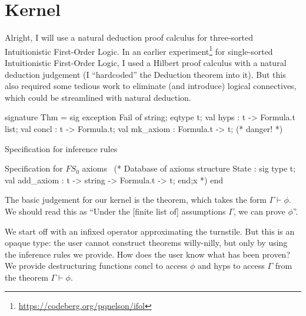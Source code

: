 
\section{Kernel}

\begin{node}
Alright, I will use a natural deduction proof calculus for
three-sorted Intuitionistic First-Order Logic. In an earlier
experiment\footnote{\url{https://codeberg.org/pqnelson/ifol}} for single-sorted Intuitionistic First-Order Logic, I used
a Hilbert proof calculus with a natural deduction judgement (I
``hardcoded'' the Deduction theorem into it). But this also required
some tedious work to eliminate (and introduce) logical connectives,
which could be streamlined with natural deduction.
\end{node}

\nwenddocs{}\endmoddef\nwstartdeflinemarkup\nwenddeflinemarkup
signature Thm = sig
  exception Fail of string;
  eqtype t;
  val hyps : t -> Formula.t list;
  val concl : t -> Formula.t;
  val mk_axiom : Formula.t -> t; (* danger! *)

  \LA{}Specification for inference rules~{\nwtagstyle{}}\RA{}

  \LA{}Specification for $FS_{0}$ axioms~{\nwtagstyle{}}\RA{}
  (* Database of axioms
  structure State : sig
              type t;
              val add_axiom : t -> string -> Formula.t -> t;
            end;x
   *)
end
\nwendcode{}\nwdocspar

\begin{node}
The basic judgement for our kernel is the theorem, which takes the
form $\Gamma\vdash\phi$. We should read this as ``Under the
[finite list of] assumptions $\Gamma$, we can prove $\phi$''.

We start off with an infixed operator approximating the turnstile. But
this is an opaque type: the user cannot construct theorems
willy-nilly, but only by using the inference rules we provide. How
does the user know what has been proven? We provide destructuring
functions {\Tt{}concl\nwendquote} to access $\phi$ and {\Tt{}hyps\nwendquote} to access $\Gamma$
from the theorem $\Gamma\vdash\phi$.
\end{node}

